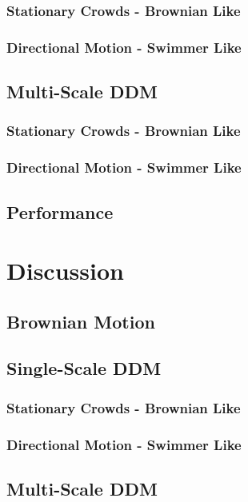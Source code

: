 \documentclass[11pt]{article}
\begin{document}
\subsubsection{Stationary Crowds - Brownian Like}

\subsubsection{Directional Motion - Swimmer Like}

\subsection{Multi-Scale DDM}
\subsubsection{Stationary Crowds - Brownian Like}

\subsubsection{Directional Motion - Swimmer Like}

\subsection{Performance}

\clearpage
\section{Discussion}
\label{section:discussion}
\subsection{Brownian Motion}
\label{section:brownian}

\subsection{Single-Scale DDM}
\subsubsection{Stationary Crowds - Brownian Like}

\subsubsection{Directional Motion - Swimmer Like}

\subsection{Multi-Scale DDM}
\end{document}
